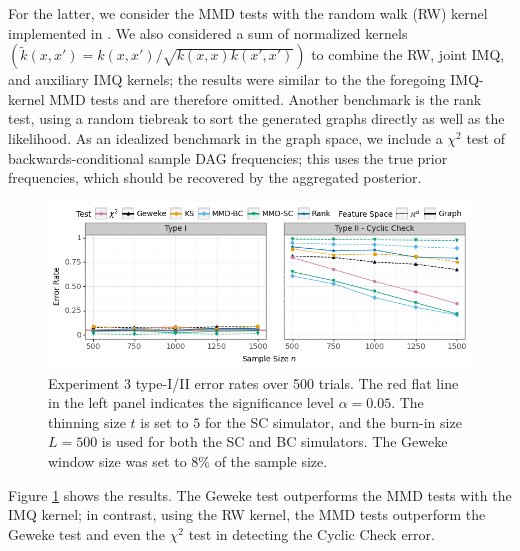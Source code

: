 \documentclass{article}
\begin{document}
For the latter, we consider the MMD tests with the random walk (RW) kernel \citep{gartner_graph_2003, vishwanathan_fast_2006} implemented in \cite{siglidis_grakel_2020}. 
We also considered a sum of normalized kernels $(\tilde{k}(x, x') = k(x, x')/\sqrt{k(x,x) k(x',x')})$ to combine the RW, joint IMQ, and auxiliary IMQ kernels; the results were similar to the the foregoing IMQ-kernel MMD tests and are therefore omitted. Another benchmark is the rank test, using a random tiebreak to sort the generated graphs directly as well as the likelihood. 
As an idealized benchmark in the graph space, we include a $\chi^{2}$ test of backwards-conditional sample DAG frequencies; this uses the true prior frequencies, which should be recovered by the aggregated posterior.
\begin{figure}[t]
    \centering
    \includegraphics[width=\textwidth]{figures/results_3.png}
    \caption{Experiment 3 type-I/II error rates over 500 trials. 
    The red flat line in the left panel indicates the significance level $\alpha=0.05$. 
    The thinning size $t$ is set to $5$ for the SC simulator, and the burn-in size $L=500$ is used for both the SC and BC simulators. The Geweke window size was set to $8\%$ of the sample size. 
    }
    \label{fig:ex3_comparison}
\end{figure}
Figure \ref{fig:ex3_comparison} shows the results. 
The Geweke test outperforms the MMD tests with the IMQ kernel; in contrast, using the RW kernel, the MMD tests outperform the Geweke test and even the $\chi^{2}$ test in detecting the Cyclic Check error. 
\end{document}
